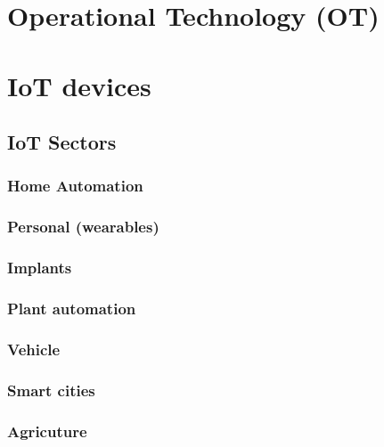 \hypertarget{operational-technology-ot}{%
\section{Operational Technology
(OT)}\label{operational-technology-ot}}

\hypertarget{iot-devices}{%
\section{IoT devices}\label{iot-devices}}

\hypertarget{iot-sectors}{%
\subsection{IoT Sectors}\label{iot-sectors}}

\hypertarget{home-automation}{%
\subsubsection{Home Automation}\label{home-automation}}

\hypertarget{personal-wearables}{%
\subsubsection{Personal (wearables)}\label{personal-wearables}}

\hypertarget{implants}{%
\subsubsection{Implants}\label{implants}}

\hypertarget{plant-automation}{%
\subsubsection{Plant automation}\label{plant-automation}}

\hypertarget{vehicle}{%
\subsubsection{Vehicle}\label{vehicle}}

\hypertarget{smart-cities}{%
\subsubsection{Smart cities}\label{smart-cities}}

\hypertarget{agricuture}{%
\subsubsection{Agricuture}\label{agricuture}}

